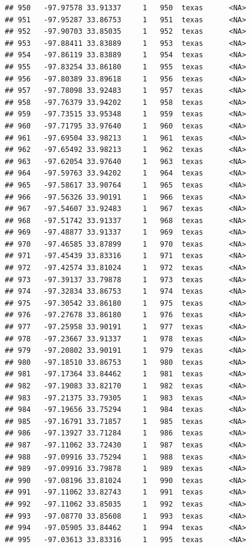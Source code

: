 \documentclass[
]{article}
\begin{document}
\begin{verbatim}
## 950   -97.97578 33.91337     1   950  texas      <NA>
## 951   -97.95287 33.86753     1   951  texas      <NA>
## 952   -97.90703 33.85035     1   952  texas      <NA>
## 953   -97.88411 33.83889     1   953  texas      <NA>
## 954   -97.86119 33.83889     1   954  texas      <NA>
## 955   -97.83254 33.86180     1   955  texas      <NA>
## 956   -97.80389 33.89618     1   956  texas      <NA>
## 957   -97.78098 33.92483     1   957  texas      <NA>
## 958   -97.76379 33.94202     1   958  texas      <NA>
## 959   -97.73515 33.95348     1   959  texas      <NA>
## 960   -97.71795 33.97640     1   960  texas      <NA>
## 961   -97.69504 33.98213     1   961  texas      <NA>
## 962   -97.65492 33.98213     1   962  texas      <NA>
## 963   -97.62054 33.97640     1   963  texas      <NA>
## 964   -97.59763 33.94202     1   964  texas      <NA>
## 965   -97.58617 33.90764     1   965  texas      <NA>
## 966   -97.56326 33.90191     1   966  texas      <NA>
## 967   -97.54607 33.92483     1   967  texas      <NA>
## 968   -97.51742 33.91337     1   968  texas      <NA>
## 969   -97.48877 33.91337     1   969  texas      <NA>
## 970   -97.46585 33.87899     1   970  texas      <NA>
## 971   -97.45439 33.83316     1   971  texas      <NA>
## 972   -97.42574 33.81024     1   972  texas      <NA>
## 973   -97.39137 33.79878     1   973  texas      <NA>
## 974   -97.32834 33.86753     1   974  texas      <NA>
## 975   -97.30542 33.86180     1   975  texas      <NA>
## 976   -97.27678 33.86180     1   976  texas      <NA>
## 977   -97.25958 33.90191     1   977  texas      <NA>
## 978   -97.23667 33.91337     1   978  texas      <NA>
## 979   -97.20802 33.90191     1   979  texas      <NA>
## 980   -97.18510 33.86753     1   980  texas      <NA>
## 981   -97.17364 33.84462     1   981  texas      <NA>
## 982   -97.19083 33.82170     1   982  texas      <NA>
## 983   -97.21375 33.79305     1   983  texas      <NA>
## 984   -97.19656 33.75294     1   984  texas      <NA>
## 985   -97.16791 33.71857     1   985  texas      <NA>
## 986   -97.13927 33.71284     1   986  texas      <NA>
## 987   -97.11062 33.72430     1   987  texas      <NA>
## 988   -97.09916 33.75294     1   988  texas      <NA>
## 989   -97.09916 33.79878     1   989  texas      <NA>
## 990   -97.08196 33.81024     1   990  texas      <NA>
## 991   -97.11062 33.82743     1   991  texas      <NA>
## 992   -97.11062 33.85035     1   992  texas      <NA>
## 993   -97.08770 33.85608     1   993  texas      <NA>
## 994   -97.05905 33.84462     1   994  texas      <NA>
## 995   -97.03613 33.83316     1   995  texas      <NA>

\end{verbatim}
\end{document}
